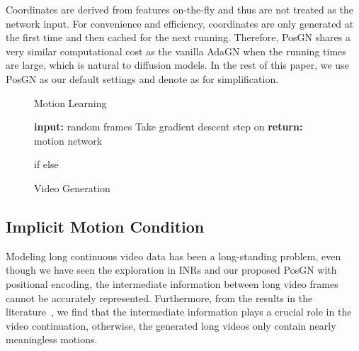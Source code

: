 \documentclass[letterpaper]{article}
\begin{document}
Coordinates  are derived from features on-the-fly and thus are not treated as the network input.
For convenience and efficiency, coordinates  are only generated at the first time and then cached for the next running.
Therefore, PosGN shares a very similar computational cost as the vanilla AdaGN when the running times are large, which is natural to diffusion models.
In the rest of this paper, we use PosGN as our default settings and denote  as  for simplification.

\algrenewcommand\algorithmicindent{0.5em}\begin{figure}[t]
\begin{minipage}[t]{0.495\textwidth}
\begin{algorithm}[H]
  \caption{Motion Learning} \label{alg:training}
  \label{algo}
  \small
  \begin{algorithmic}[1]
    \State \textbf{input:} random frames  
    \Repeat
      \State 
      \State 
      \State 
      \State 
      \State 
      \State Take gradient descent step on
      \Statex 
    \State \textbf{return:} motion network 
  \end{algorithmic}
\end{algorithm}
\end{minipage}
\hfill
\begin{minipage}[t]{0.495\textwidth}
\begin{algorithm}[H]
  \caption{Video Generation} \label{alg:sampling}
  \small
  \begin{algorithmic}[1]
    \For{}
    \State 
    \For{}
      \State if 
      \Statex 
      \State else
      \Statex  
      \Statex 
      \Statex 
    \EndFor
    \EndFor
    \vspace{.06in}
  \end{algorithmic}
\end{algorithm}
\end{minipage}
\vspace{-1\baselineskip}
\end{figure}


\subsection{Implicit Motion Condition}
Modeling long continuous video data has been a long-standing problem, even though we have seen the exploration in INRs and our proposed PosGN with positional encoding, the intermediate information between long video frames cannot be accurately represented.
Furthermore, from the results in the literature~\cite{yu2022generating,skorokhodov2021stylegan}, we find that the intermediate information plays a crucial role in the video continuation, otherwise, the generated long videos only contain nearly meaningless motions.
\end{document}
